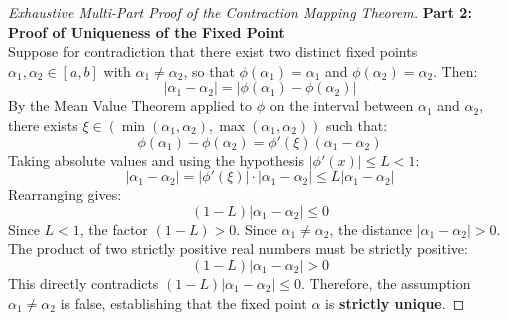 \begin{proof}[Exhaustive Multi-Part Proof of the Contraction Mapping Theorem]
\medskip
\noindent\textbf{Part 2: Proof of Uniqueness of the Fixed Point} \\
Suppose for contradiction that there exist two distinct fixed points $\alpha_1, \alpha_2 \in [a, b]$ with $\alpha_1 \ne \alpha_2$, so that $\phi(\alpha_1) = \alpha_1$ and $\phi(\alpha_2) = \alpha_2$. Then:
\begin{equation}
    |\alpha_1 - \alpha_2| = |\phi(\alpha_1) - \phi(\alpha_2)|
\end{equation}
By the Mean Value Theorem applied to $\phi$ on the interval between $\alpha_1$ and $\alpha_2$, there exists $\xi \in (\min(\alpha_1, \alpha_2), \max(\alpha_1, \alpha_2))$ such that:
\begin{equation}
    \phi(\alpha_1) - \phi(\alpha_2) = \phi'(\xi)(\alpha_1 - \alpha_2)
\end{equation}
Taking absolute values and using the hypothesis $|\phi'(x)| \le L < 1$:
\begin{equation}
    |\alpha_1 - \alpha_2| = |\phi'(\xi)| \cdot |\alpha_1 - \alpha_2| \le L |\alpha_1 - \alpha_2|
\end{equation}
Rearranging gives:
\begin{equation}
    (1 - L)|\alpha_1 - \alpha_2| \le 0
\end{equation}
Since $L < 1$, the factor $(1 - L) > 0$. Since $\alpha_1 \ne \alpha_2$, the distance $|\alpha_1 - \alpha_2| > 0$. The product of two strictly positive real numbers must be strictly positive:
\begin{equation}
    (1 - L)|\alpha_1 - \alpha_2| > 0
\end{equation}
This directly contradicts $(1 - L)|\alpha_1 - \alpha_2| \le 0$. Therefore, the assumption $\alpha_1 \ne \alpha_2$ is false, establishing that the fixed point $\alpha$ is \textbf{strictly unique}.


\end{proof}
